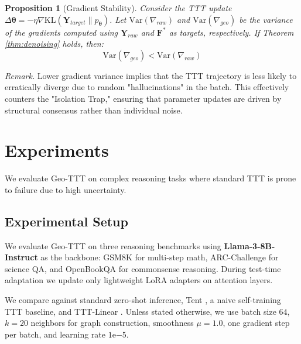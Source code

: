 \documentclass{article}
\theoremstyle{plain}
\newtheorem{proposition}[theorem]{Proposition}
\theoremstyle{definition}
\theoremstyle{remark}
\newcommand{\F}{\mathbf{F}}        %
\newcommand{\Y}{\mathbf{Y}}        %
\newcommand{\ThetaParam}{\boldsymbol{\theta}}
\begin{document}
\begin{proposition}[Gradient Stability]
\label{prop:stability}
Consider the TTT update $\Delta \ThetaParam = -\eta \nabla \text{KL}(\mathbf{Y}_{target} \| p_{\ThetaParam})$. Let $\text{Var}(\nabla_{raw})$ and $\text{Var}(\nabla_{geo})$ be the variance of the gradients computed using $\Y_{raw}$ and $\F^*$ as targets, respectively.
If Theorem \ref{thm:denoising} holds, then:
\begin{equation}
    \text{Var}(\nabla_{geo}) < \text{Var}(\nabla_{raw})
\end{equation}
\end{proposition}

\textit{Remark.} Lower gradient variance implies that the TTT trajectory is less likely to erratically diverge due to random "hallucinations" in the batch. This effectively counters the "Isolation Trap," ensuring that parameter updates are driven by structural consensus rather than individual noise.

\section{Experiments}
\label{sec:experiments}

We evaluate Geo-TTT on complex reasoning tasks where standard TTT is prone to failure due to high uncertainty.

\subsection{Experimental Setup}

We evaluate Geo-TTT on three reasoning benchmarks using \textbf{Llama-3-8B-Instruct} as the backbone: GSM8K for multi-step math, ARC-Challenge for science QA, and OpenBookQA for commonsense reasoning. During test-time adaptation we update only lightweight LoRA adapters on attention layers.

We compare against standard zero-shot inference, Tent \cite{wang2021tent}, a naive self-training TTT baseline, and TTT-Linear \cite{sun2023learning}. Unless stated otherwise, we use batch size $64$, $k=20$ neighbors for graph construction, smoothness $\mu=1.0$, one gradient step per batch, and learning rate $1\mathrm{e}{-5}$.
\end{document}
